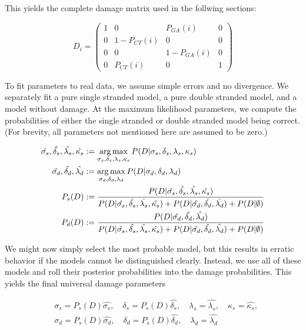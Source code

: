 \documentclass{article}
\newcommand{\argmax}{\operatornamewithlimits{arg\,max}}
\begin{document}
This yields the complete damage matrix used in the follwing sections:

\begin{equation}
D_i = \left( \begin{array}{cccc}
            1 &      0      &  P_{GA}(i)  & 0 \\
            0 & 1-P_{CT}(i) &      0      & 0 \\
            0 &      0      & 1-P_{GA}(i) & 0 \\
            0 &  P_{CT}(i)  &      0      & 1 
        \end{array} \right)
\end{equation}        

To fit parameters to real data, we assume simple errors and no divergence.  We separately fit a pure single stranded model, a pure
double stranded model, and a model without damage.  At the maximum likelihood parameters, we compute the probabilities of either the
single stranded or double stranded model being correct.  (For brevity, all parameters not mentioned here are assumed to be zero.)

\begin{align*}
\hat{\sigma_s}, \hat{\delta_s}, \hat{\lambda_s}, \hat{\kappa_s} &:= \argmax_{\sigma_s, \delta_s, \lambda_s, \kappa_s}
    P(D | \sigma_s, \delta_s, \lambda_s, \kappa_s ) \\
\hat{\sigma_d}, \hat{\delta_d}, \hat{\lambda_d} &:= \argmax_{\sigma_d, \delta_d, \lambda_d}
    P(D | \sigma_d, \delta_d, \lambda_d ) \\
P_s(D) &:= \frac{   
    P(D | \hat{\sigma_s}, \hat{\delta_s}, \hat{\lambda_s}, \hat{\kappa_s}) }{
    P(D | \hat{\sigma_s}, \hat{\delta_s}, \hat{\lambda_s}, \hat{\kappa_s}) +
    P(D | \hat{\sigma_d}, \hat{\delta_d}, \hat{\lambda_d} ) +
    P(D | \emptyset ) } \\
P_d(D) &:= \frac{   
    P(D | \hat{\sigma_d}, \hat{\delta_d}, \hat{\lambda_d} ) }{
    P(D | \hat{\sigma_s}, \hat{\delta_s}, \hat{\lambda_s}, \hat{\kappa_s}) +
    P(D | \hat{\sigma_d}, \hat{\delta_d}, \hat{\lambda_d} ) +
    P(D | \emptyset ) }
\end{align*}

We might now simply select the most probable model, but this results in erratic behavior if the models cannot be distinguished
clearly.  Instead, we use all of these models and roll their posterior probabilities into the damage probabilities.  This yields the
final universal damage parameters

\begin{align*}
&\sigma_s = P_s(D) \hat{\sigma_s}, \quad 
\delta_s = P_s(D) \hat{\delta_s}, \quad 
\lambda_s = \hat{\lambda_s}, \quad
\kappa_s = \hat{\kappa_s}, \\
&\sigma_d = P_s(D) \hat{\sigma_d}, \quad 
\delta_d = P_s(D) \hat{\delta_d}, \quad 
\lambda_d = \hat{\lambda_d}
\end{align*}
\end{document}
